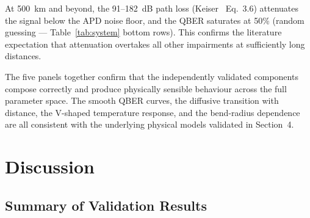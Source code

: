 \documentclass[3p,times,preprint]{elsarticle}
\begin{document}
At 500~km and beyond, the 91--182~dB path loss
(Keiser~\cite{keiser} Eq.~3.6) attenuates the signal below the APD
noise floor, and the QBER saturates at 50\% (random guessing ---
Table~\ref{tab:system} bottom rows).  This confirms the literature
expectation that attenuation overtakes all other impairments at
sufficiently long distances.

The five panels together confirm that the independently validated
components compose correctly and produce physically sensible behaviour
across the full parameter space.  The smooth QBER curves, the diffusive
transition with distance, the V-shaped temperature response, and the
bend-radius dependence are all consistent with the underlying physical
models validated in Section~4.

\section{Discussion}

\subsection{Summary of Validation Results}
\end{document}
